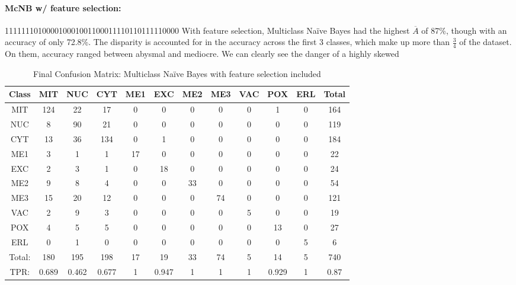 \begin{table}[h!]
\paragraph{McNB w/ feature selection:}
111111101000010001001100011110110111110000
With feature selection, Multiclass Na\"ive Bayes had the highest $\overline{A}$ of 87\%, though with an accuracy of only 72.8\%.  The disparity is accounted for in the accuracy across the first 3 classes, which make up more than $\frac{3}{4}$ of the dataset.  On them, accuracy ranged between abysmal and mediocre.  We can clearly see the danger of a highly skewed   
\\
\begin{tabular}{|c|c|c|c|c|c|c|c|c|c|c|c|}
	\hline
Class&MIT&NUC&CYT&ME1&EXC&ME2&ME3&VAC&POX&ERL&Total\\
\hline
MIT&124&22&17&0&0&0&0&0&1&0&164\\
NUC&8&90&21&0&0&0&0&0&0&0&119\\
CYT&13&36&134&0&1&0&0&0&0&0&184\\
ME1&3&1&1&17&0&0&0&0&0&0&22\\
EXC&2&3&1&0&18&0&0&0&0&0&24\\
ME2&9&8&4&0&0&33&0&0&0&0&54\\
ME3&15&20&12&0&0&0&74&0&0&0&121\\
VAC&2&9&3&0&0&0&0&5&0&0&19\\
POX&4&5&5&0&0&0&0&0&13&0&27\\
ERL&0&1&0&0&0&0&0&0&0&5&6\\
\hline
Total:&180&195&198&17&19&33&74&5&14&5&740\\
TPR:&0.689&0.462&0.677&1&0.947&1&1&1&0.929&1&0.87\\
\hline
\end{tabular}
\caption[Yeast: Multiclass Na\"ive Bayes with Feature Selection Confusion Matrix]{Final Confusion Matrix: Multiclass Na\"ive Bayes with feature selection included}
\label{tab:yeastmcnbfeatures}
\end{table}


